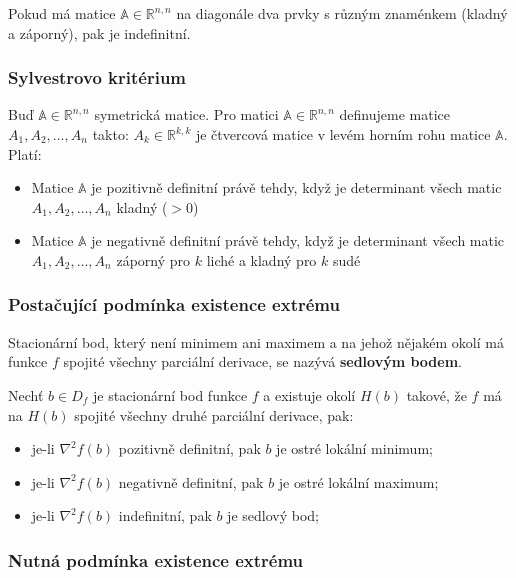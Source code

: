 \noindent Pokud má matice $\mathbb{A} \in \mathbb{R}^{n,n}$ na diagonále dva prvky s různým znaménkem (kladný a záporný), pak je indefinitní.

\subsubsection{Sylvestrovo kritérium}

Buď $\mathbb{A} \in \mathbb{R}^{n,n}$ symetrická matice. Pro matici $\mathbb{A} \in \mathbb{R}^{n,n}$ definujeme matice $A_1, A_2, \ldots, A_n$ takto: $A_k \in \mathbb{R}^{k,k} $ je čtvercová matice v levém horním rohu matice $\mathbb{A}$. Platí:

\begin{itemize}
    \item Matice $\mathbb{A}$ je pozitivně definitní právě tehdy, když je determinant všech matic $A_1, A_2, \ldots, A_n$ kladný ($> 0$)
    \item Matice $\mathbb{A}$ je negativně definitní právě tehdy, když je determinant všech matic $A_1, A_2, \ldots, A_n$ záporný pro $k$ liché a kladný pro $k$ sudé
\end{itemize}

\subsubsection{Postačující podmínka existence extrému}

Stacionární bod, který není minimem ani maximem a na jehož nějakém okolí má funkce $f$ spojité všechny parciální derivace, se nazývá \textbf{sedlovým bodem}.

\vspace{4pt}
\noindent Nechť $b \in D_f$ je stacionární bod funkce $f$ a existuje okolí $H(b)$ takové, že $f$ má na $H(b)$ spojité všechny druhé parciální derivace, pak:

\begin{itemize}
    \item je-li $\nabla^2 f(b)$ pozitivně definitní, pak $b$ je ostré lokální minimum;
    \item je-li $\nabla^2 f(b)$ negativně definitní, pak $b$ je ostré lokální maximum;
    \item je-li $\nabla^2 f(b)$ indefinitní, pak $b$ je sedlový bod;
\end{itemize}

\subsubsection{Nutná podmínka existence extrému}


